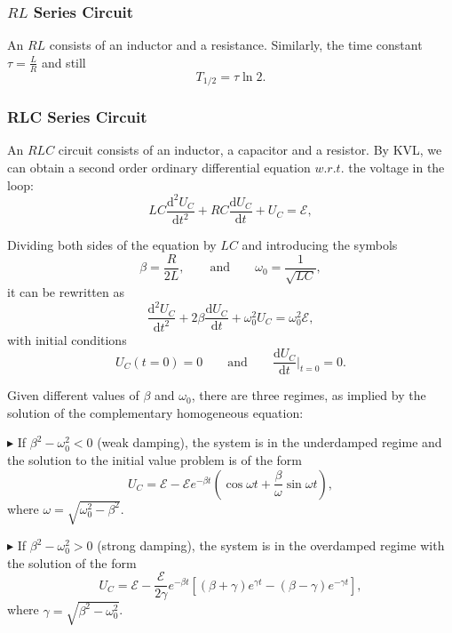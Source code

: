 \documentclass{article}
\begin{document}
\subsubsection{$RL$ Series Circuit}
An $RL$ consists of an inductor and a resistance. Similarly, the time constant $\tau = \frac{L}{R}$
and still
\begin{equation}
    T_{1/2} = \tau\ln 2.
    \label{eq:ThalfRL}
\end{equation}

	\subsubsection{RLC Series Circuit}
An $RLC$ circuit consists of an inductor, a capacitor and a resistor. By KVL, we can obtain a second order ordinary differential equation	 $w.r.t.$ the voltage in the loop:
\begin{equation}
  LC\frac{\mathrm{d}^2U_C}{\mathrm{d}t^2} + RC\frac{\mathrm{d}U_C}{\mathrm{d}t} + U_C = \mathcal{E},
\end{equation}

Dividing both sides of the equation by $LC$ and introducing the symbols
$$    \beta = \frac{R}{2L},\hspace{2em} \text{and} \hspace{2em}\omega_0 = \frac{1}{\sqrt{LC}},$$
it can be rewritten as
\begin{equation}
  \frac{\mathrm{d}^2U_C}{\mathrm{d}t^2} + 2\beta\frac{\mathrm{d}U_C}{\mathrm{d}t} + \omega_0^2U_C = \omega_0^2\mathcal{E},
\end{equation}
with initial conditions
$$U_C(t=0) = 0\hspace{2em} \text{and} \hspace{2em}\frac{\mathrm{d}U_C}{\mathrm{d}t}\bigg|_{t=0} = 0.$$

Given different values of $\beta$ and $\omega_0$, there are three regimes, as implied by the solution of the complementary homogeneous equation: 

$\blacktriangleright$ If $\beta^2 - \omega_0^2 < 0$ (weak damping), the system is in the underdamped regime and the solution to the initial value problem is of the form
$$U_C = \mathcal{E} - \mathcal{E}e^{-\beta t}(\cos\omega t +\frac{\beta}{\omega}\sin \omega t),$$
where $\omega = \sqrt{\omega_0^2 - \beta^2}$.

$\blacktriangleright$ If $\beta^2 - \omega_0^2 > 0$ (strong damping), the system is in the overdamped regime with the solution of the form
$$U_C = \mathcal{E} - \frac{\mathcal{E}}{2\gamma}e^{-\beta t}[(\beta + \gamma)e^{\gamma t} - (\beta -\gamma)e^{-\gamma t}],$$
where $\gamma = \sqrt{\beta^2 - \omega_0^2}$.
\end{document}
